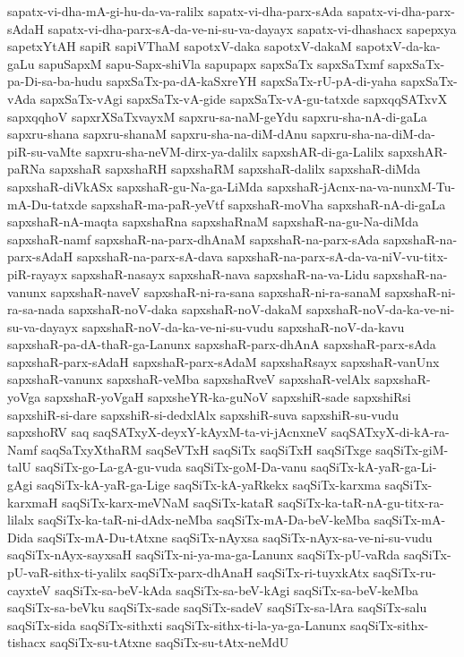 {sapatx-vi-dha-mA-gi-hu-da-va-ralilx
sapatx-vi-dha-parx-sAda
sapatx-vi-dha-parx-sAdaH
sapatx-vi-dha-parx-sA-da-ve-ni-su-va-dayayx
sapatx-vi-dhashacx
sapepxya
sapetxYtAH
sapiR
sapiVThaM
sapotxV-daka
sapotxV-dakaM
sapotxV-da-ka-gaLu
sapuSapxM
sapu-Sapx-shiVla
sapupapx
sapxSaTx
sapxSaTxmf
sapxSaTx-pa-Di-sa-ba-hudu
sapxSaTx-pa-dA-kaSxreYH
sapxSaTx-rU-pA-di-yaha
sapxSaTx-vAda
sapxSaTx-vAgi
sapxSaTx-vA-gide
sapxSaTx-vA-gu-tatxde
sapxqqSATxvX
sapxqqhoV
sapxrXSaTxvayxM
sapxru-sa-naM-geYdu
sapxru-sha-nA-di-gaLa
sapxru-shana
sapxru-shanaM
sapxru-sha-na-diM-dAnu
sapxru-sha-na-diM-da-piR-su-vaMte
sapxru-sha-neVM-dirx-ya-dalilx
sapxshAR-di-ga-Lalilx
sapxshAR-paRNa
sapxshaR
sapxshaRH
sapxshaRM
sapxshaR-dalilx
sapxshaR-diMda
sapxshaR-diVkASx
sapxshaR-gu-Na-ga-LiMda
sapxshaR-jAcnx-na-va-nunxM-Tu-mA-Du-tatxde
sapxshaR-ma-paR-yeVtf
sapxshaR-moVha
sapxshaR-nA-di-gaLa
sapxshaR-nA-maqta
sapxshaRna
sapxshaRnaM
sapxshaR-na-gu-Na-diMda
sapxshaR-namf
sapxshaR-na-parx-dhAnaM
sapxshaR-na-parx-sAda
sapxshaR-na-parx-sAdaH
sapxshaR-na-parx-sA-dava
sapxshaR-na-parx-sA-da-va-niV-vu-titx-piR-rayayx
sapxshaR-nasayx
sapxshaR-nava
sapxshaR-na-va-Lidu
sapxshaR-na-vanunx
sapxshaR-naveV
sapxshaR-ni-ra-sana
sapxshaR-ni-ra-sanaM
sapxshaR-ni-ra-sa-nada
sapxshaR-noV-daka
sapxshaR-noV-dakaM
sapxshaR-noV-da-ka-ve-ni-su-va-dayayx
sapxshaR-noV-da-ka-ve-ni-su-vudu
sapxshaR-noV-da-kavu
sapxshaR-pa-dA-thaR-ga-Lanunx
sapxshaR-parx-dhAnA
sapxshaR-parx-sAda
sapxshaR-parx-sAdaH
sapxshaR-parx-sAdaM
sapxshaRsayx
sapxshaR-vanUnx
sapxshaR-vanunx
sapxshaR-veMba
sapxshaRveV
sapxshaR-velAlx
sapxshaR-yoVga
sapxshaR-yoVgaH
sapxsheYR-ka-guNoV
sapxshiR-sade
sapxshiRsi
sapxshiR-si-dare
sapxshiR-si-dedxlAlx
sapxshiR-suva
sapxshiR-su-vudu
sapxshoRV
saq
saqSATxyX-deyxY-kAyxM-ta-vi-jAcnxneV
saqSATxyX-di-kA-ra-Namf
saqSaTxyXthaRM
saqSeVTxH
saqSiTx
saqSiTxH
saqSiTxge
saqSiTx-giM-talU
saqSiTx-go-La-gA-gu-vuda
saqSiTx-goM-Da-vanu
saqSiTx-kA-yaR-ga-Li-gAgi
saqSiTx-kA-yaR-ga-Lige
saqSiTx-kA-yaRkekx
saqSiTx-karxma
saqSiTx-karxmaH
saqSiTx-karx-meVNaM
saqSiTx-kataR
saqSiTx-ka-taR-nA-gu-titx-ra-lilalx
saqSiTx-ka-taR-ni-dAdx-neMba
saqSiTx-mA-Da-beV-keMba
saqSiTx-mA-Dida
saqSiTx-mA-Du-tAtxne
saqSiTx-nAyxsa
saqSiTx-nAyx-sa-ve-ni-su-vudu
saqSiTx-nAyx-sayxsaH
saqSiTx-ni-ya-ma-ga-Lanunx
saqSiTx-pU-vaRda
saqSiTx-pU-vaR-sithx-ti-yalilx
saqSiTx-parx-dhAnaH
saqSiTx-ri-tuyxkAtx
saqSiTx-ru-cayxteV
saqSiTx-sa-beV-kAda
saqSiTx-sa-beV-kAgi
saqSiTx-sa-beV-keMba
saqSiTx-sa-beVku
saqSiTx-sade
saqSiTx-sadeV
saqSiTx-sa-lAra
saqSiTx-salu
saqSiTx-sida
saqSiTx-sithxti
saqSiTx-sithx-ti-la-ya-ga-Lanunx
saqSiTx-sithx-tishacx
saqSiTx-su-tAtxne
saqSiTx-su-tAtx-neMdU
}
